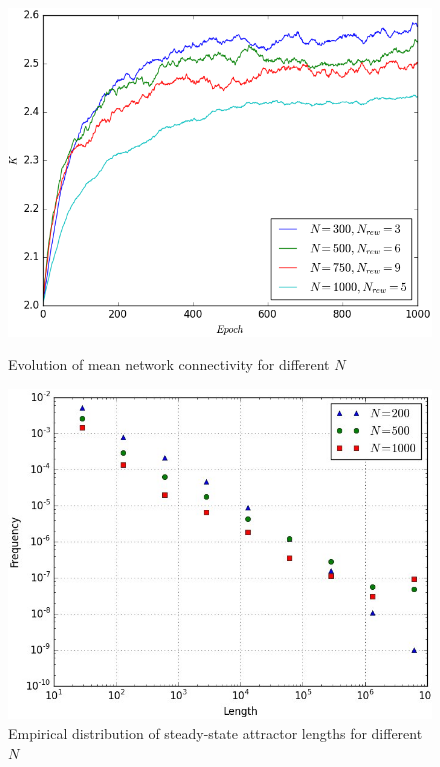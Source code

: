 \documentclass[procedia]{easychair}
\begin{document}
	
	\begin{figure}[h]
		\begin{minipage}[t]{0.45\textwidth}
			\includegraphics[width=1.0\textwidth]{plots/evolution}
			\caption{Evolution of mean network connectivity for different $N$}
			\label{fig:evolution}
		\end{minipage}\hfill
		\begin{minipage}[t]{0.45\textwidth}
			\centering
			\includegraphics[width=1.0\textwidth]{plots/attractors}
			\caption{Empirical distribution of steady-state attractor lengths for different $N$}
			\label{fig:attractors}
		\end{minipage}
	\end{figure}
\end{document}
